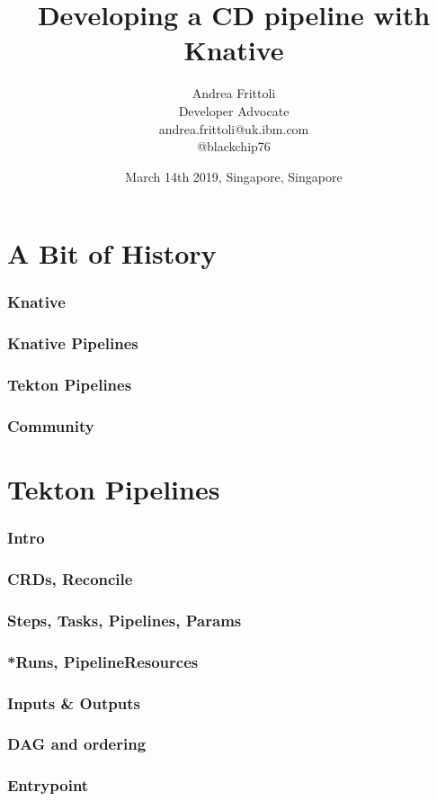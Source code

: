 \documentclass[aspectratio=169,11pt,hyperref={colorlinks=true}]{beamer}
\title{Developing a CD pipeline with Knative}
\date[DevOps Meetup]{March 14th 2019, Singapore, Singapore}
\author[Andrea]{
  Andrea Frittoli \\
  Developer Advocate \\
  andrea.frittoli@uk.ibm.com \\
  @blackchip76
}
\begin{document}
\begin{frame}[noframenumbering]
\titlepage{}
\end{frame}

\section{A Bit of History}

\begin{grayframe}
  \frametitle{Knative}
\end{grayframe}

\begin{grayframe}
  \frametitle{Knative Pipelines}
\end{grayframe}

\begin{grayframe}
  \frametitle{Tekton Pipelines}
\end{grayframe}

\begin{grayframe}
  \frametitle{Community}
\end{grayframe}

\section{Tekton Pipelines}

\begin{grayframe}
  \frametitle{Intro}
\end{grayframe}

\begin{grayframe}
  \frametitle{CRDs, Reconcile}
\end{grayframe}

\begin{grayframe}
  \frametitle{Steps, Tasks, Pipelines, Params}
\end{grayframe}

\begin{grayframe}
  \frametitle{*Runs, PipelineResources}
\end{grayframe}

\begin{grayframe}
  \frametitle{Inputs \& Outputs}
\end{grayframe}

\begin{grayframe}
  \frametitle{DAG and ordering}
\end{grayframe}

\begin{grayframe}
  \frametitle{Entrypoint}
\end{grayframe}
\end{document}
